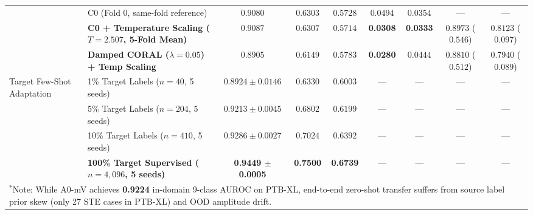 \documentclass[preprint,12pt]{elsarticle}
\begin{document}
\begin{table}[htbp]
{\begin{tabular}{llccccccc}
& C0 (Fold 0, same-fold reference) & $0.9080$ & $0.6303$ & $0.5728$ & $0.0494$ & $0.0354$ & --- & --- \\
& \textbf{C0 + Temperature Scaling ($T=2.507$, 5-Fold Mean)} & $0.9087$ & $0.6307$ & $0.5714$ & \textbf{0.0308} & \textbf{0.0333} & $0.8973$ ($0.546$) & $0.8123$ ($0.097$) \\
& \textbf{Damped CORAL ($\lambda=0.05$) + Temp Scaling} & $0.8905$ & $0.6149$ & $0.5783$ & \textbf{0.0280} & $0.0444$ & $0.8810$ ($0.512$) & $0.7940$ ($0.089$) \\
\midrule
\multirow{4}{*}{Target Few-Shot Adaptation} 
& 1\% Target Labels ($n=40$, 5 seeds) & $0.8924 \pm 0.0146$ & $0.6330$ & $0.6003$ & --- & --- & --- & --- \\
& 5\% Target Labels ($n=204$, 5 seeds) & $0.9213 \pm 0.0045$ & $0.6802$ & $0.6199$ & --- & --- & --- & --- \\
& 10\% Target Labels ($n=410$, 5 seeds) & $0.9286 \pm 0.0027$ & $0.7024$ & $0.6392$ & --- & --- & --- & --- \\
& \textbf{100\% Target Supervised ($n=4,096$, 5 seeds)} & \textbf{0.9449 $\pm$ 0.0005} & \textbf{0.7500} & \textbf{0.6739} & --- & --- & --- & --- \\
\bottomrule
\multicolumn{9}{l}{\footnotesize $^*$Note: While A0-mV achieves \textbf{0.9224} in-domain 9-class AUROC on PTB-XL, end-to-end zero-shot transfer suffers from source label prior skew (only 27 STE cases in PTB-XL) and OOD amplitude drift.}
\end{tabular}%
}
\end{table}
\end{document}

